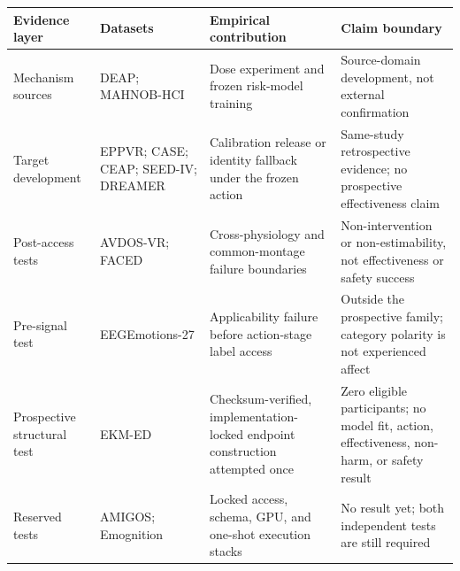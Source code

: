 \begin{tabular}{@{}>{\raggedright\arraybackslash}p{}>{\raggedright\arraybackslash}p{}>{\raggedright\arraybackslash}p{}>{\raggedright\arraybackslash}p{}@{}}
\toprule
Evidence layer & Datasets & Empirical contribution & Claim boundary \\
\midrule
Mechanism sources & DEAP; MAHNOB-HCI & Dose experiment and frozen risk-model training & Source-domain development, not external confirmation \\
Target development & EPPVR; CASE; CEAP; SEED-IV; DREAMER & Calibration release or identity fallback under the frozen action & Same-study retrospective evidence; no prospective effectiveness claim \\
Post-access tests & AVDOS-VR; FACED & Cross-physiology and common-montage failure boundaries & Non-intervention or non-estimability, not effectiveness or safety success \\
Pre-signal test & EEGEmotions-27 & Applicability failure before action-stage label access & Outside the prospective family; category polarity is not experienced affect \\
Prospective structural test & EKM-ED & Checksum-verified, implementation-locked endpoint construction attempted once & Zero eligible participants; no model fit, action, effectiveness, non-harm, or safety result \\
Reserved tests & AMIGOS; Emognition & Locked access, schema, GPU, and one-shot execution stacks & No result yet; both independent tests are still required \\
\bottomrule
\end{tabular}
